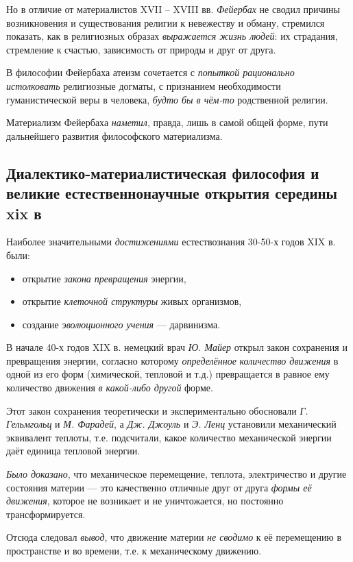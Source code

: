 \documentclass[a4paper,14pt,russian]{extreport}
\begin{document}
Но в отличие от материалистов XVII -- XVIII вв. \emph{Фейербах} не сводил причины возникновения и существования религии к невежеству и обману, стремился показать, как в религиозных образах \emph{выражается жизнь людей}: их страдания, стремление к счастью, зависимость от природы и друг от друга.

В философии Фейербаха атеизм сочетается с \emph{попыткой рационально истолковать} религиозные догматы, с признанием необходимости гуманистической веры в человека, \emph{будто бы в чём-то} родственной религии.

Материализм Фейербаха \emph{наметил}, правда, лишь в самой общей форме, пути дальнейшего развития философского материализма.

\subsection{Диалектико-материалистическая философия и великие естественнонаучные открытия середины xix в}

Наиболее значительными \emph{достижениями} естествознания 30-50-х годов XIX в. были:

\begin{itemize}
\item открытие \emph{закона превращения} энергии,
\item открытие \emph{клеточной структуры} живых организмов,
\item создание \emph{эволюционного учения} --- дарвинизма.
\end{itemize}

В начале 40-х годов XIX в. немецкий врач \emph{Ю. Майер} открыл закон сохранения и превращения энергии, согласно которому \emph{определённое} \emph{количество движения} в одной из его форм (химической, тепловой и т.д.) превращается в равное ему количество движения \emph{в какой-либо другой} форме.

Этот закон сохранения теоретически и экспериментально обосновали \emph{Г. Гельмгольц} и \emph{М. Фарадей}, а \emph{Дж. Джоуль} и \emph{Э. Ленц} установили механический эквивалент теплоты, т.е. подсчитали, какое количество механической энергии даёт единица тепловой энергии.

\emph{Было доказано}, что механическое перемещение, теплота, электричество и другие состояния материи --- это качественно отличные друг от друга \emph{формы её движения}, которое не возникает и не уничтожается, но постоянно трансформируется.

Отсюда следовал \emph{вывод}, что движение материи \emph{не сводимо} к её перемещению в пространстве и во времени, т.е. к механическому движению.
\end{document}
